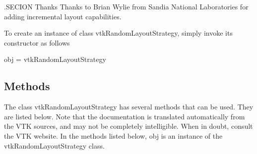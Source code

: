 .S\-E\-C\-I\-O\-N Thanks Thanks to Brian Wylie from Sandia National Laboratories for adding incremental layout capabilities.

To create an instance of class vtk\-Random\-Layout\-Strategy, simply invoke its constructor as follows \begin{DoxyVerb}  obj = vtkRandomLayoutStrategy
\end{DoxyVerb}
 \hypertarget{vtkwidgets_vtkxyplotwidget_Methods}{}\subsection{Methods}\label{vtkwidgets_vtkxyplotwidget_Methods}
The class vtk\-Random\-Layout\-Strategy has several methods that can be used. They are listed below. Note that the documentation is translated automatically from the V\-T\-K sources, and may not be completely intelligible. When in doubt, consult the V\-T\-K website. In the methods listed below, {\ttfamily obj} is an instance of the vtk\-Random\-Layout\-Strategy class. 
